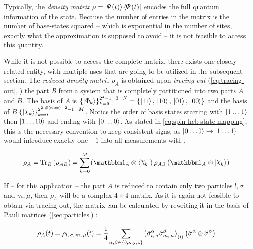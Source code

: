 Typically, the \emph{density matrix} $\rho = \ketpsiof[]{t}\brapsiof[]{t}$ encodes the full quantum information of the state. 
Because the number of entries in the matrix is the number of base-states squared -- which is exponential in the number of sites, exactly what the approximation is supposed to avoid -- it is not feasible to access this quantity.

While it is not possible to access the complete matrix, there exists one closely related entity, with multiple uses that are going to be utilized in the subsequent section.
The \emph{reduced density matrix} $\rho_A$ is obtained upon \emph{tracing out} (\autoref{eq:tracing-out}, \cite{partialTraceEntanglementOfSubsystemsBlochVector}) the part $B$ from a system that is completely partitioned into two parts $A$ and $B$.
The basis of $A$ is $\left\{\ketN[\Phi_k]\right\}_{k=0}^{2^{2}-1 = 3 = N} = \left\{\ketN[11],\,\ketN[10],\,\ketN[01],\,\ketN[00]\right\}$ and the basis of $B$ $\left\{\ketN[\Chi_k]\right\}_{k=0}^{2^{2 \cdot \#\left(\text{sites}\right) - 2}-1 = M}$.
Notice the order of basis states starting with $\ketN[1\dots1]$ then $\ketN[1\dots10]$ and ending with $\ketN[0\dots0]$. As stated in \autoref{eq:spin-hcb-state-mapping}, this is the necessary convention to keep consistent signs, as $\ketN[0\dots0] \rightarrow \ketN[1\dots1]$ would introduce exactly one $-1$ into all measurements with .

\begin{equation}
    \label{eq:tracing-out}
    \rho_A = \partialTrace{B}{\rho_{AB}} = \sum\limits_{k=0}^{M} \left(\one[A]\otimes\braN[\Chi_k] \right)\rho_{AB}\left(\one[A]\otimes\ketN[\Chi_k]\right)
\end{equation}

If -- for this application -- the part $A$ is reduced to contain only two particles $l, \sigma$ and $m, \mu$, then $\rho_A$ will be a complex $4\times 4$ matrix.
As it is again not feasible to obtain via tracing out, the matrix can be calculated by rewriting it in the basis of Pauli matrices (\ref{sec:particles}) \cite{isingDynamicsWithClassicalNetworks}:

\begin{equation}
    \label{eq:reduced-density-matrix-via-paulis}
    \rho_A (t) = \rho_{l,\,\sigma,\,m,\,\mu} (t) = \frac{1}{4} \sum\limits_{\alpha,\beta\in\left\{0,\text{x},\text{y},\text{z}\right\}}
    \timeExpectationVal{ \pauli[l,\,\sigma]{$\alpha$}\pauli[m,\,\mu]{$\beta$} } \left(\pauli[]{$\alpha$}\otimes\pauli[]{$\beta$}\right)
\end{equation}

